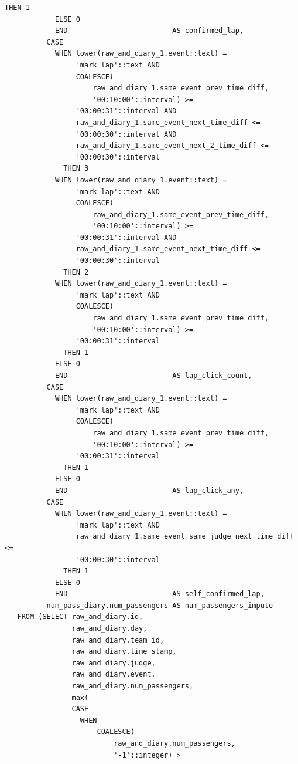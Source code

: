 \documentclass[11pt]{article}
\begin{document}
\begin{lstlisting}[style=sql, caption={Full Audit query}, label={lst:sql_audit_query}]
              THEN 1
            ELSE 0
            END                         AS confirmed_lap,
          CASE
            WHEN lower(raw_and_diary_1.event::text) =
                 'mark lap'::text AND
                 COALESCE(
                     raw_and_diary_1.same_event_prev_time_diff,
                     '00:10:00'::interval) >=
                 '00:00:31'::interval AND
                 raw_and_diary_1.same_event_next_time_diff <=
                 '00:00:30'::interval AND
                 raw_and_diary_1.same_event_next_2_time_diff <=
                 '00:00:30'::interval
              THEN 3
            WHEN lower(raw_and_diary_1.event::text) =
                 'mark lap'::text AND
                 COALESCE(
                     raw_and_diary_1.same_event_prev_time_diff,
                     '00:10:00'::interval) >=
                 '00:00:31'::interval AND
                 raw_and_diary_1.same_event_next_time_diff <=
                 '00:00:30'::interval
              THEN 2
            WHEN lower(raw_and_diary_1.event::text) =
                 'mark lap'::text AND
                 COALESCE(
                     raw_and_diary_1.same_event_prev_time_diff,
                     '00:10:00'::interval) >=
                 '00:00:31'::interval
              THEN 1
            ELSE 0
            END                         AS lap_click_count,
          CASE
            WHEN lower(raw_and_diary_1.event::text) =
                 'mark lap'::text AND
                 COALESCE(
                     raw_and_diary_1.same_event_prev_time_diff,
                     '00:10:00'::interval) >=
                 '00:00:31'::interval
              THEN 1
            ELSE 0
            END                         AS lap_click_any,
          CASE
            WHEN lower(raw_and_diary_1.event::text) =
                 'mark lap'::text AND
                 raw_and_diary_1.same_event_same_judge_next_time_diff <=
                 '00:00:30'::interval
              THEN 1
            ELSE 0
            END                         AS self_confirmed_lap,
          num_pass_diary.num_passengers AS num_passengers_impute
   FROM (SELECT raw_and_diary.id,
                raw_and_diary.day,
                raw_and_diary.team_id,
                raw_and_diary.time_stamp,
                raw_and_diary.judge,
                raw_and_diary.event,
                raw_and_diary.num_passengers,
                max(
                CASE
                  WHEN
                      COALESCE(
                          raw_and_diary.num_passengers,
                          '-1'::integer) >

\end{lstlisting}
\end{document}
